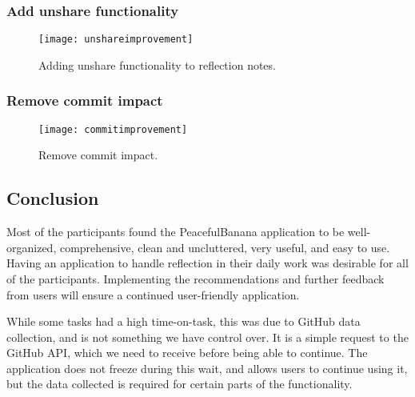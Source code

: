 \subsubsection*{Add unshare functionality}
\begin{figure}[h!]
    \centering
        \texttt{[image: unshareimprovement]}
    \caption{Adding unshare functionality to reflection notes.}
    \label{unshareimprovement}
\end{figure}

\subsubsection*{Remove commit impact}
\begin{figure}[h!]
    \centering
        \texttt{[image: commitimprovement]}
    \caption{Remove commit impact.}
    \label{commitimprovement}
\end{figure}

\subsection{Conclusion}
Most of the participants found the PeacefulBanana application to be well-organized, comprehensive, clean and uncluttered, very useful, and easy to use. Having an application to handle reflection in their daily work was desirable for all of the participants. Implementing the recommendations and further feedback from users will ensure a continued user-friendly application.

While some tasks had a high time-on-task, this was due to GitHub data collection, and is not something we have control over. It is a simple request to the GitHub API, which we need to receive before being able to continue. The application does not freeze during this wait, and allows users to continue using it, but the data collected is required for certain parts of the functionality.  
